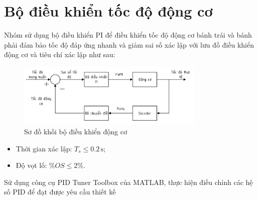      \section{Bộ điều khiển tốc độ động cơ}
          \hspace*{0.6cm}Nhóm sử dụng bộ điều khiển PI để điều khiển tốc độ động cơ bánh trái và bánh phải
          đảm bảo tốc độ đáp ứng nhanh và giảm sai số xác lập với lưu đồ điều khiển động
          cơ và tiêu chí xác lập như sau:
               \begin{figure}[H]
                    \centering
                    \includegraphics[width=0.8\textwidth]{pictures/chapter6/PI_controller.png}
                    \caption{Sơ đồ khối bộ điều khiển động cơ}
                    \label{PI_controller}
               \end{figure}
          \begin{itemize}
               \item Thời gian xác lập: $T_s \leq 0.2 \,\mathrm{s}$;
               \item Độ vọt lố: $\%OS \leq 2 \%$.
          \end{itemize}
          \hspace*{0.6cm}Sử dụng công cụ PID Tuner Toolbox của MATLAB, thực hiện điều chỉnh các hệ số PID để đạt được yêu cầu thiết kế
